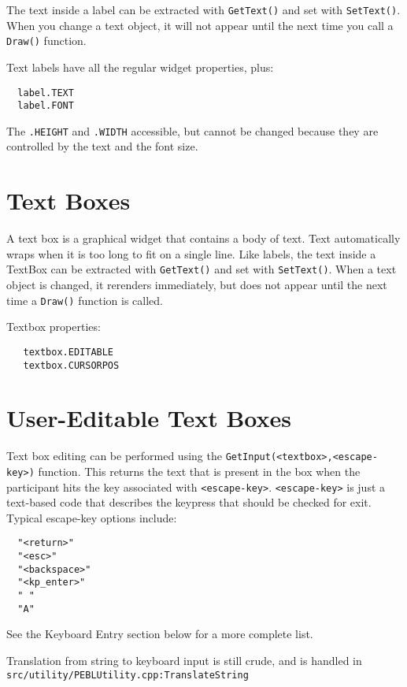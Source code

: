 The text inside a label can be extracted with \texttt{GetText()} 
and set with \texttt{SetText()}. When you change a text object, 
it will not appear until the next time you call a \texttt{Draw()} function.

Text labels have all the regular widget properties, plus:
\begin{verbatim}
  label.TEXT 
  label.FONT
\end{verbatim}
  


The \verb+.HEIGHT+ and \verb+.WIDTH+ accessible, but cannot be changed
because they are controlled by the text and the font size.


\section{Text Boxes}

A text box is a graphical widget that contains a body of text.  Text
automatically wraps when it is too long to fit on a single line.  Like
labels, the text inside a TextBox can be extracted with
\texttt{GetText()} and set with \texttt{SetText()}. When a text object
is changed, it rerenders immediately, but does not appear until the
next time a \texttt{Draw()} function is called.


Textbox properties:
\begin{verbatim}
   textbox.EDITABLE
   textbox.CURSORPOS 
\end{verbatim}
 


\section{User-Editable Text Boxes}

Text box editing can be performed using the \verb+GetInput(<textbox>,<escape-key>)+ function.  This returns the text that is present in the box when the participant hits the key associated with \verb+<escape-key>+.  
\verb+<escape-key>+ is just a text-based code that describes the keypress 
that should be checked for exit. Typical escape-key options include:
\begin{verbatim}
  "<return>"
  "<esc>"
  "<backspace>"
  "<kp_enter>"
  " "
  "A"
\end{verbatim}
 
See the Keyboard Entry section below for a more complete list.

Translation from string to keyboard input is still crude, 
and is handled in \texttt{src/utility/PEBLUtility.cpp:TranslateString} 


